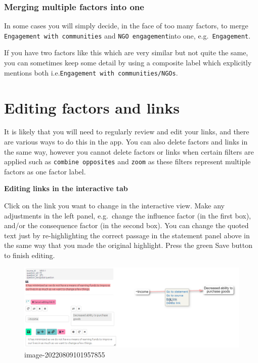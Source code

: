 \documentclass[
]{book}
\begin{document}
\hypertarget{merging-multiple-factors-into-one}{%
\subsection{Merging multiple factors into one}\label{merging-multiple-factors-into-one}}

In some cases you will simply decide, in the face of too many factors, to merge \texttt{Engagement\ with\ communities} and \texttt{NGO\ engagement}into one, e.g.~\texttt{Engagement}.

If you have two factors like this which are very similar but not quite the same, you can sometimes keep some detail by using a composite label which explicitly mentions both i.e.\texttt{Engagement\ with\ communities/NGOs}.

\hypertarget{xedit-factor-and-links}{%
\chapter{Editing factors and links}\label{xedit-factor-and-links}}

It is likely that you will need to regularly review and edit your links, and there are various ways to do this in the app. You can also delete factors and links in the same way, however you cannot delete factors or links when certain filters are applied such as \texttt{combine\ opposites} and \texttt{zoom} as these filters represent multiple factors as one factor label.

\textbf{Editing links in the interactive tab}

Click on the link you want to change in the interactive view. Make any adjustments in the left panel, e.g.~change the influence factor (in the first box), and/or the consequence factor (in the second box). You can change the quoted text just by re-highlighting the correct passage in the statement panel above in the same way that you made the original highlight. Press the green Save button to finish editing.

\begin{figure}
\centering
\includegraphics[width=6.77083in,height=\textheight]{_assets/image-20220809101957855.png}
\caption{image-20220809101957855}
\end{figure}
\end{document}
